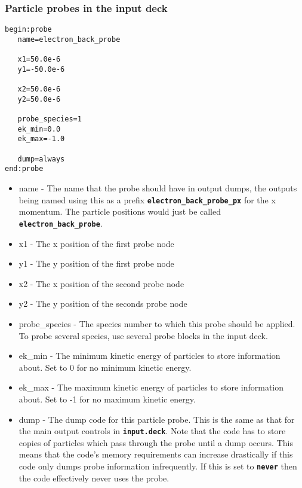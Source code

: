 \documentclass[12pt]{article}
\newcommand{\simpleboxverbatim}{\begin{Verbatim}[obeytabs=true,frame=single,
  framerule=0.5mm,rulecolor=\color{warwickmid}]}
\newcommand{\inlinecode}[1]{{\color{warwickred} \bf\texttt{#1}}}
\begin{document}
\subsubsection{Particle probes in the input deck}
\simpleboxverbatim
begin:probe
   name=electron_back_probe

   x1=50.0e-6
   y1=-50.0e-6

   x2=50.0e-6
   y2=50.0e-6

   probe_species=1
   ek_min=0.0
   ek_max=-1.0

   dump=always
end:probe
\end{Verbatim}
\begin{itemize}
\item name - The name that the probe should have in output dumps, the outputs
  being named using this as a prefix \inlinecode{electron\_back\_probe\_px}
  for the x momentum. The particle positions would just be called
  \inlinecode{electron\_back\_probe}.
\item x1 - The x position of the first probe node
\item y1 - The y position of the first probe node
\item x2 - The x position of the second probe node
\item y2 - The y position of the seconds probe node
\item probe\_species - The species number to which this probe should be
  applied. To probe several species, use several probe blocks in the input
  deck.
\item ek\_min - The minimum kinetic energy of particles to store information
  about. Set to 0 for no minimum kinetic energy.
\item ek\_max - The maximum kinetic energy of particles to store information
  about. Set to -1 for no maximum kinetic energy.
\item dump - The dump code for this particle probe. This is the same as that
  for the main output controls in \inlinecode{input.deck}. Note that the code
  has to store copies of particles which pass through the probe until a dump
  occurs. This means that the code's memory requirements can increase
  drastically if this code only dumps probe information infrequently. If this
  is set to \inlinecode{never} then the code effectively never uses the probe.
\end{itemize}
\end{document}
